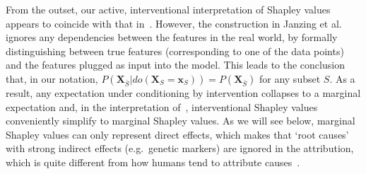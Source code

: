 \documentclass{article}
\newcommand{\vX}{\mathbf{X}}
\newcommand{\vx}{\mathbf{x}}
\newcommand{\expectation}{\mathbb{E}}
\newcommand{\dodo}{\mathit{do}}
\newcommand{\lvdo}[1]{\dodo(\vX_{#1} = \vx_{#1})}
\begin{document}
From the outset, our active, interventional interpretation of Shapley values appears to coincide with that in~\cite{datta2016algorithmic,janzing2019feature,lundberg2020local}. However, the construction in Janzing et al.~\cite{janzing2019feature} ignores any dependencies between the features in the real world, by formally distinguishing between true features (corresponding to one of the data points) and the features plugged as input into the model. This leads to the conclusion that, in our notation, $P(\vX_{\bar{S}}|\lvdo{S}) = P(\vX_{\bar{S}})$ for any subset $S$. As a result, any expectation under conditioning by intervention collapses to a marginal expectation and, in the interpretation of~\cite{datta2016algorithmic,janzing2019feature,lundberg2020local}, interventional Shapley values conveniently simplify to marginal Shapley values. As we will see below, marginal Shapley values can only represent direct effects, which makes that `root causes' with strong indirect effects (e.g.\ genetic markers) are ignored in the attribution, which is quite different from how humans tend to attribute causes~\cite{sober1988apportioning}.




\end{document}
